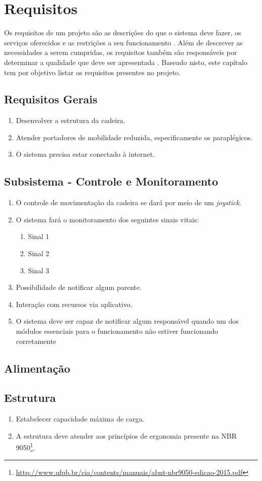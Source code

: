 \chapter{Requisitos}

Os requisitos de um projeto são as descrições do que o sistema deve fazer, os
serviços oferecidos e as restrições a seu funcionamento \cite{sommerville}.
Além de descrever as necessidades a serem cumpridas, os requisitos também são responsáveis
por determinar a qualidade que deve ser apresentada \cite{robertson}.
Baseado nisto, este capítulo tem por objetivo listar os requisitos presentes
no projeto.

\section{Requisitos Gerais}

\begin{enumerate}
\item Desenvolver a estrutura da cadeira.
\item Atender portadores de mobilidade reduzida, especificamente os paraplégicos.
\item O sistema precisa estar conectado à internet.
\end{enumerate}

\section{Subsistema - Controle e Monitoramento}

\begin{enumerate}[resume*]
\item O controle de movimentação da cadeira se dará por meio de um \textit{joystick}.
\item O sistema fará o monitoramento dos seguintes sinais vitais:
\begin{enumerate}[resume*]
\item Sinal 1
\item Sinal 2
\item Sinal 3
\end{enumerate}
\item Possibilidade de notificar algum parente.
\item Interação com recursos via aplicativo.
\item O sistema deve ser capaz de notificar algum
responsável quando um dos módulos essenciais para o funcionamento não estiver
funcionando corretamente
\end{enumerate}

\section{Alimentação}

\section{Estrutura}

\begin{enumerate}[resume*]
\item Estabelecer capacidade máxima de carga.
\item A estrutura deve atender aos princípios de ergonomia presente na NBR 9050\footnote{\url{http://www.ufpb.br/cia/contents/manuais/abnt-nbr9050-edicao-2015.pdf}}.
\end{enumerate}
